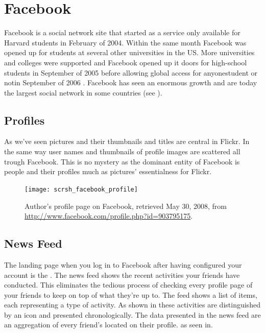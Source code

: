 \section{Facebook}
\label{section:analysis.facebook}

Facebook is a social network site that started as a service only available for
Harvard students in February of 2004. Within the same month Facebook was
opened up for students at several other universities in the
US. More universities and colleges were supported and Facebook opened up it
doors for high-school students in September of 2005 \citep{cassidy06}
before allowing global access for anyone\dash{}student or not\dash{}in
September of 2006 \citep{abram06}.
Facebook has seen an enormous growth and are today the largest social network
in some countries (see
).

\subsection{Profiles}

As we've seen pictures and their thumbnails and titles are central in Flickr.
In the same way user names and thumbnails of profile images are scattered all
trough Facebook. This is no mystery as the dominant entity of Facebook is
people and their profiles much as pictures' essentialness for Flickr.

\begin{figure}
  \begin{whole}
    \texttt{[image: scrsh\_facebook\_profile]}
    \caption[Facebook Profile]{%
       Author's profile page on Facebook,
       retrieved May 30, 2008, from
       \url{http://www.facebook.com/profile.php?id=903795175}.}
    \label{figure:scrsh.facebook.profile}
  \end{whole}
\end{figure}

\subsection{News Feed}
\label{section:analysis.facebook.news.feed}

The landing page when you log in to Facebook after having configured your
account is the . The news feed shows the recent activities your
friends have conducted. This eliminates the tedious process of checking every
profile page of your friends to keep on top of what they're up to.
The feed shows a list of items, each representing a type of activity. As
shown in 
these activities are distinguished by an
icon and presented chronologically. The data presented in the news feed are an
aggregation of every friend's  located on their profile.
as seen in.

